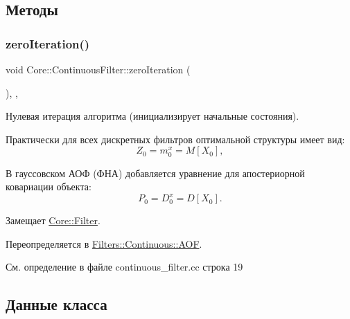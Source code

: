 \subsection{Методы}
\hypertarget{class_core_1_1_continuous_filter_a4c30983f9354344717538f807855f2ae}{}\label{class_core_1_1_continuous_filter_a4c30983f9354344717538f807855f2ae} 
\subsubsection{\texorpdfstring{zero\+Iteration()}{zeroIteration()}}
{\footnotesize\ttfamily void Core\+::\+Continuous\+Filter\+::zero\+Iteration (\begin{DoxyParamCaption}{ }\end{DoxyParamCaption})\hspace{0.3cm}{\ttfamily [override]}, {\ttfamily [protected]}, {\ttfamily [virtual]}}



Нулевая итерация алгоритма (инициализирует начальные состояния). 

Практически для всех дискретных фильтров оптимальной структуры имеет вид\+: \[Z_0 = m_0^x = M[X_0],\]

В гауссовском АОФ (ФНА) добавляется уравнение для апостериорной ковариации объекта\+: \[P_0 = D_0^x = D[X_0].\] 

Замещает \hyperlink{class_core_1_1_filter_af95880b734c4b8dc3d8c02f222b32506}{Core\+::\+Filter}.



Переопределяется в \hyperlink{class_filters_1_1_continuous_1_1_a_o_f_ab416b56dbeb26366f495f03b3c08ad5e}{Filters\+::\+Continuous\+::\+A\+OF}.



См. определение в файле continuous\+\_\+filter.\+cc строка 19



\subsection{Данные класса}
\hypertarget{class_core_1_1_continuous_filter_aaea7d47a9d573b9a88007780c4c3a722}{}\label{class_core_1_1_continuous_filter_aaea7d47a9d573b9a88007780c4c3a722} 

